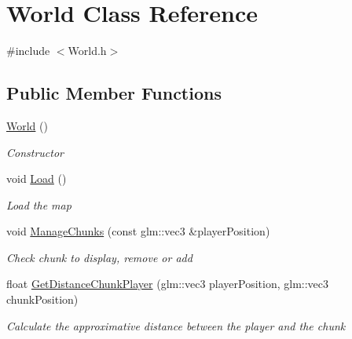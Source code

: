 \hypertarget{class_world}{}\section{World Class Reference}
\label{class_world}


{\ttfamily \#include $<$World.\+h$>$}

\subsection*{Public Member Functions}
\begin{DoxyCompactItemize}
\item 
\mbox{\hyperlink{class_world_afa39d4e6f714a7a3691ac0c656f5e8a8}{World}} ()
\begin{DoxyCompactList}\small\item\em Constructor \end{DoxyCompactList}\item 
void \mbox{\hyperlink{class_world_a0f570293be4fd6ab6b3d3cc986647971}{Load}} ()
\begin{DoxyCompactList}\small\item\em Load the map \end{DoxyCompactList}\item 
void \mbox{\hyperlink{class_world_a89fd1fed1e6d40999644faf882bfb744}{Manage\+Chunks}} (const glm\+::vec3 \&player\+Position)
\begin{DoxyCompactList}\small\item\em Check chunk to display, remove or add \end{DoxyCompactList}\item 
float \mbox{\hyperlink{class_world_a1de2c2b22fa0ef78039e8935beb89b1b}{Get\+Distance\+Chunk\+Player}} (glm\+::vec3 player\+Position, glm\+::vec3 chunk\+Position)
\begin{DoxyCompactList}\small\item\em Calculate the approximative distance between the player and the chunk \end{DoxyCompactList}\end{DoxyCompactItemize}
